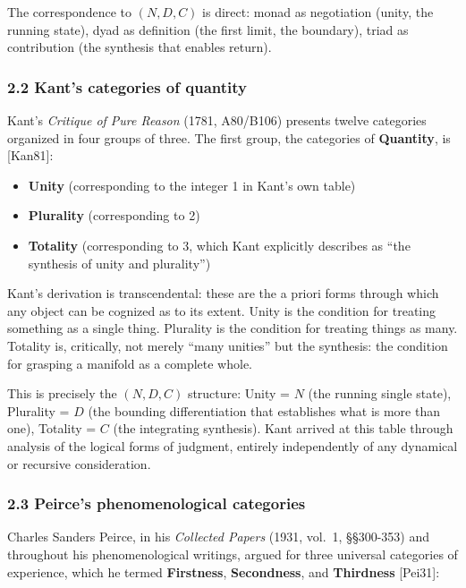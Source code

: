 \documentclass[
  11pt,
  letterpaper,
]{article}
\providecommand{\tightlist}{%
  \setlength{\itemsep}{0pt}\setlength{\parskip}{0pt}}
\begin{document}
The correspondence to \((N, D, C)\) is direct: monad as negotiation
(unity, the running state), dyad as definition (the first limit, the
boundary), triad as contribution (the synthesis that enables return).

\subsubsection{2.2 Kant's categories of
quantity}\label{kants-categories-of-quantity}

Kant's \emph{Critique of Pure Reason} (1781, A80/B106) presents twelve
categories organized in four groups of three. The first group, the
categories of \textbf{Quantity}, is {[}Kan81{]}:

\begin{itemize}
\tightlist
\item
  \textbf{Unity} (corresponding to the integer 1 in Kant's own table)
\item
  \textbf{Plurality} (corresponding to 2)
\item
  \textbf{Totality} (corresponding to 3, which Kant explicitly describes
  as ``the synthesis of unity and plurality'')
\end{itemize}

Kant's derivation is transcendental: these are the a priori forms
through which any object can be cognized as to its extent. Unity is the
condition for treating something as a single thing. Plurality is the
condition for treating things as many. Totality is, critically, not
merely ``many unities'' but the synthesis: the condition for grasping a
manifold as a complete whole.

This is precisely the \((N, D, C)\) structure: Unity = \(N\) (the
running single state), Plurality = \(D\) (the bounding differentiation
that establishes what is more than one), Totality = \(C\) (the
integrating synthesis). Kant arrived at this table through analysis of
the logical forms of judgment, entirely independently of any dynamical
or recursive consideration.

\subsubsection{2.3 Peirce's phenomenological
categories}\label{peirces-phenomenological-categories}

Charles Sanders Peirce, in his \emph{Collected Papers} (1931, vol.~1,
§§300-353) and throughout his phenomenological writings, argued for
three universal categories of experience, which he termed
\textbf{Firstness}, \textbf{Secondness}, and \textbf{Thirdness}
{[}Pei31{]}:
\end{document}
